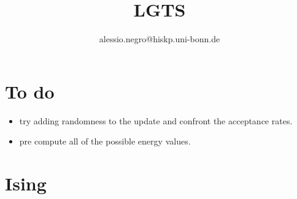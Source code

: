 \documentclass[12pt]{article}
\title{LGTS}
\author{alessio.negro@hiskp.uni-bonn.de}
\begin{document}
\raggedright

\maketitle

\section{To do}
\begin{itemize}
    \item try adding randomness to the update and confront the acceptance rates.
    \item pre compute all of the possible energy values.
\end{itemize}

\section{Ising}
\end{document}
